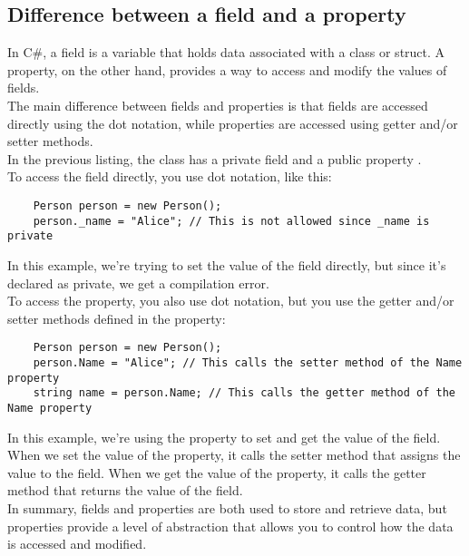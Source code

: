 \documentclass{report}
\begin{document}
\subsection{Difference between a field and a property}

In C\#, a field is a variable that holds data associated with a class or struct. A property, on the other hand, provides a way to access and modify the values of fields.\\

The main difference between fields and properties is that fields are accessed directly using the dot notation, while properties are accessed using getter and/or setter methods.\\

In the previous listing, the  class has a private field  and a public property .\\

To access the  field directly, you use dot notation, like this:

\begin{verbatim}
    Person person = new Person();
    person._name = "Alice"; // This is not allowed since _name is private
\end{verbatim}

In this example, we're trying to set the value of the  field directly, but since it's declared as private, we get a compilation error.\\

To access the  property, you also use dot notation, but you use the getter and/or setter methods defined in the property:

\begin{verbatim}
    Person person = new Person();
    person.Name = "Alice"; // This calls the setter method of the Name property
    string name = person.Name; // This calls the getter method of the Name property
\end{verbatim}

In this example, we're using the  property to set and get the value of the  field. When we set the value of the  property, it calls the setter method that assigns the value to the  field. When we get the value of the  property, it calls the getter method that returns the value of the  field.\\

In summary, fields and properties are both used to store and retrieve data, but properties provide a level of abstraction that allows you to control how the data is accessed and modified.
\end{document}

